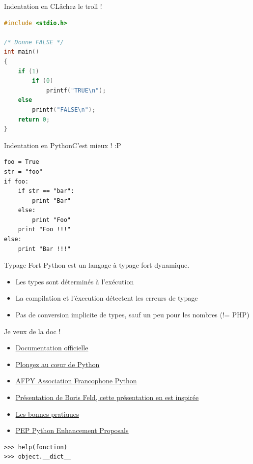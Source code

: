 \documentclass{beamer}
\begin{document}
\begin{frame}[fragile]{Indentation en C}{Lâchez le troll !}
\begin{lstlisting}[language=C]
#include <stdio.h>

/* Donne FALSE */
int main()
{
    if (1)
        if (0)
            printf("TRUE\n");
    else
        printf("FALSE\n");
    return 0;
}
\end{lstlisting}

\end{frame}

\begin{frame}[fragile]{Indentation en Python}{C'est mieux ! :P}
 
\begin{lstlisting}
foo = True
str = "foo"
if foo:
    if str == "bar":
        print "Bar"
    else:
        print "Foo"
    print "Foo !!!"
else:
    print "Bar !!!"
\end{lstlisting}

\end{frame}

\begin{frame}{Typage Fort}
Python est un langage à typage fort dynamique.

\begin{itemize}
 \item Les types sont déterminés à l'exécution
 \item La compilation et l'éxecution détectent les erreurs de typage
 \item Pas de conversion implicite de types, sauf un peu pour les nombres (!= PHP)
\end{itemize}

\end{frame}



\begin{frame}[fragile]{Je veux de la doc !}
\begin{itemize}
 \item \underline{\href{http://docs.python.org/}{Documentation officielle}}
 \item \underline{\href{http://diveintopython.adrahon.org/}{Plongez au c\oe{}ur de Python}}
 \item \underline{\href{http://www.afpy.org/}{AFPY Association Francophone Python}}
 \item \underline{\href{http://feldboris.alwaysdata.net/blog/pages/presentations/}{Présentation de Boris Feld, cette présentation en est inspirée}}
 \item \underline{\href{http://www.biologeek.com/bonnes-pratiques,conferences,django,python,traduction/bonnes-pratiques-et-astuces-python/}{Les bonnes pratiques}}
 \item \underline{\href{http://www.python.org/dev/peps/}{PEP Python Enhancement Proposals}}
\end{itemize}

\begin{lstlisting}
>>> help(fonction)
>>> object.__dict__
\end{lstlisting}
\end{frame}
\end{document}
